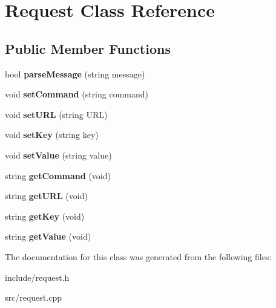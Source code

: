 \hypertarget{classRequest}{}\section{Request Class Reference}
\label{classRequest}
\subsection*{Public Member Functions}
\begin{DoxyCompactItemize}
\item 
\mbox{\label{classRequest_a0e6d43ab05a6c0ff06679177e1004ddc}} 
bool {\bfseries parse\+Message} (string message)
\item 
\mbox{\label{classRequest_a4fe67f0c9cccfd530174eb3d8fb54013}} 
void {\bfseries set\+Command} (string command)
\item 
\mbox{\label{classRequest_a1a46a4b8f73d3eb03c39ada91b26eeed}} 
void {\bfseries set\+U\+RL} (string U\+RL)
\item 
\mbox{\label{classRequest_a56210902bb0d240b4615d6fde144ea42}} 
void {\bfseries set\+Key} (string key)
\item 
\mbox{\label{classRequest_a2f8dbfdcbf1d9f07e8d1aa7216b044e3}} 
void {\bfseries set\+Value} (string value)
\item 
\mbox{\label{classRequest_a95ef26627def0c193c332b9bfd4ebf8e}} 
string {\bfseries get\+Command} (void)
\item 
\mbox{\label{classRequest_a49d0bafc034c350c8af8c3bb666e0099}} 
string {\bfseries get\+U\+RL} (void)
\item 
\mbox{\label{classRequest_aef5c14196e6a7c021f3797fc2a43473c}} 
string {\bfseries get\+Key} (void)
\item 
\mbox{\label{classRequest_adf447291d428212c0c6d93e4c72fb127}} 
string {\bfseries get\+Value} (void)
\end{DoxyCompactItemize}


The documentation for this class was generated from the following files\+:\begin{DoxyCompactItemize}
\item 
include/request.\+h\item 
src/request.\+cpp\end{DoxyCompactItemize}
